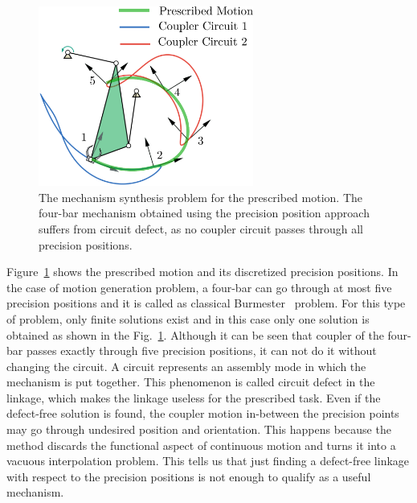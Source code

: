 \documentclass{article}
\begin{document}
\begin{itemize}
\begin{figure}
\centering
\includegraphics[width=200pt]{fig_circuit_defect.eps}
  \caption{The mechanism synthesis problem for the prescribed motion.
  The four-bar mechanism obtained using the precision position approach suffers from circuit defect, as no coupler circuit passes through all precision positions.}
\label{circuit_defect}
\end{figure}

Figure~\ref{circuit_defect} shows the prescribed motion and its discretized precision positions.
In the case of motion generation problem, a four-bar can go through at most five precision positions and it is called as classical Burmester~\cite{Burmester86} problem.
For this type of problem, only finite solutions exist and in this case only one solution is obtained as shown in the Fig.~\ref{circuit_defect}.
Although it can be seen that coupler of the four-bar passes exactly through five precision positions, it can not do it without changing the circuit.
A circuit represents an assembly mode in which the mechanism is put together.
This phenomenon is called circuit defect in the linkage, which makes the linkage useless for the prescribed task.
Even if the defect-free solution is found, the coupler motion in-between the precision points may go through undesired position and orientation.
This happens because the method discards the functional aspect of continuous motion and turns it into a vacuous interpolation problem.
This tells us that just finding a defect-free linkage with respect to the precision positions is not enough to qualify as a useful mechanism.


\end{itemize}
\end{document}
